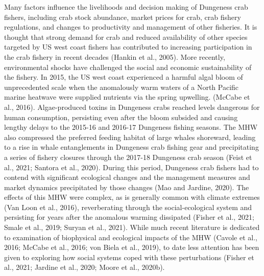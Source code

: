 \documentclass[]{elsarticle} %
\begin{document}
Many factors influence the livelihoods and decision making of Dungeness
crab fishers, including crab stock abundance, market prices for crab,
crab fishery regulations, and changes to productivity and management of
other fisheries. It is thought that strong demand for crab and reduced
availability of other species targeted by US west coast fishers has
contributed to increasing participation in the crab fishery in recent
decades (Hankin et al., 2005). More recently, environmental shocks have
challenged the social and economic sustainability of the fishery. In
2015, the US west coast experienced a harmful algal bloom of
unprecedented scale when the anomalously warm waters of a North Pacific
marine heatwave were supplied nutrients via the spring upwelling.
(McCabe et al., 2016). Algae-produced toxins in Dungeness crabs reached
levels dangerous for human consumption, persisting even after the bloom
subsided and causing lengthy delays to the 2015-16 and 2016-17 Dungeness
fishing seasons. The MHW also compressed the preferred feeding habitat
of large whales shoreward, leading to a rise in whale entanglements in
Dungeness crab fishing gear and precipitating a series of fishery
closures through the 2017-18 Dungeness crab season (Feist et al., 2021;
Santora et al., 2020). During this period, Dungeness crab fishers had to
contend with significant ecological changes and the management measures
and market dynamics precipitated by those changes (Mao and Jardine,
2020). The effects of this MHW were complex, as is generally common with
climate extremes (Van Loon et al., 2016), reverberating through the
social-ecological system and persisting for years after the anomalous
warming dissipated (Fisher et al., 2021; Smale et al., 2019; Suryan et
al., 2021). While much recent literature is dedicated to examination of
biophysical and ecological impacts of the MHW (Cavole et al., 2016;
McCabe et al., 2016; von Biela et al., 2019), to date less attention has
been given to exploring how social systems coped with these
perturbations (Fisher et al., 2021; Jardine et al., 2020; Moore et al.,
2020b).
\end{document}
